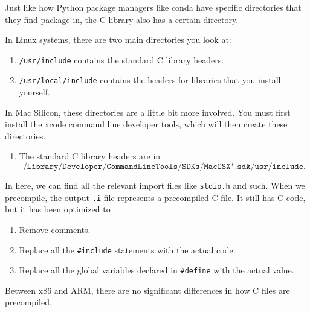     Just like how Python package managers like conda have specific directories that they find package in, the C library also has a certain directory. 

    \begin{definition}
      In Linux systems, there are two main directories you look at: 
      \begin{enumerate}
        \item \texttt{/usr/include} contains the standard C library headers.
        \item \texttt{/usr/local/include} contains the headers for libraries that you install yourself.
      \end{enumerate}
      In Mac Silicon, these directories are a little bit more involved. You must first install the xcode command line developer tools, which will then create these directories. 
      \begin{enumerate}
        \item The standard C library headers are in 
          \begin{equation*}
            \texttt{/Library/Developer/CommandLineTools/SDKs/MacOSX*.sdk/usr/include}.
          \end{equation*}
      \end{enumerate}
    \end{definition}

    In here, we can find all the relevant import files like \texttt{stdio.h} and such. When we precompile, the output \texttt{.i} file represents a precompiled C file. It still has C code, but it has been optimized to 
    \begin{enumerate}
      \item Remove comments. 
      \item Replace all the \texttt{\#include} statements with the actual code. 
      \item Replace all the global variables declared in \texttt{\#define} with the actual value.
    \end{enumerate}
    Between x86 and ARM, there are no significant differences in how C files are precompiled. 

